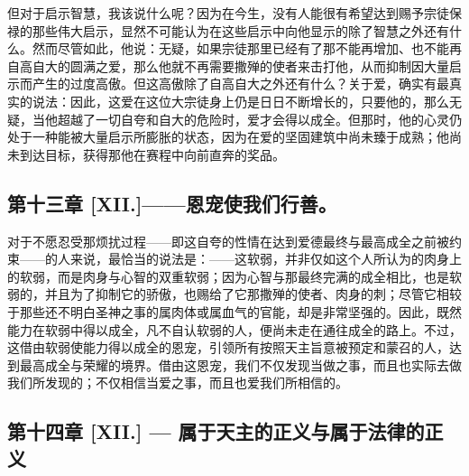 但对于启示智慧，我该说什么呢？因为在今生，没有人能很有希望达到赐予宗徒保禄的那些伟大启示，显然不可能认为在这些启示中向他显示的除了智慧之外还有什么。然而尽管如此，他说：无疑，如果宗徒那里已经有了那不能再增加、也不能再自高自大的圆满之爱，那么他就不再需要撒殚的使者来击打他，从而抑制因大量启示而产生的过度高傲。但这高傲除了自高自大之外还有什么？关于爱，确实有最真实的说法：因此，这爱在这位大宗徒身上仍是日日不断增长的，只要他的，那么无疑，当他超越了一切自夸和自大的危险时，爱才会得以成全。但那时，他的心灵仍处于一种能被大量启示所膨胀的状态，因为在爱的坚固建筑中尚未臻于成熟；他尚未到达目标，获得那他在赛程中向前直奔的奖品。\par


\subsection{第十三章 [XII.]——恩宠使我们行善。}

对于不愿忍受那烦扰过程——即这自夸的性情在达到爱德最终与最高成全之前被约束——的人来说，最恰当的说法是：——这软弱，并非仅如这个人所认为的肉身上的软弱，而是肉身与心智的双重软弱；因为心智与那最终完满的成全相比，也是软弱的，并且为了抑制它的骄傲，也赐给了它那撒殚的使者、肉身的刺；尽管它相较于那些还不明白圣神之事的属肉体或属血气的官能，却是非常坚强的。因此，既然能力在软弱中得以成全，凡不自认软弱的人，便尚未走在通往成全的路上。不过，这借由软弱使能力得以成全的恩宠，引领所有按照天主旨意被预定和蒙召的人，达到最高成全与荣耀的境界。借由这恩宠，我们不仅发现当做之事，而且也实际去做我们所发现的；不仅相信当爱之事，而且也爱我们所相信的。\par


\subsection{第十四章 [XII.] — 属于天主的正义与属于法律的正义}

